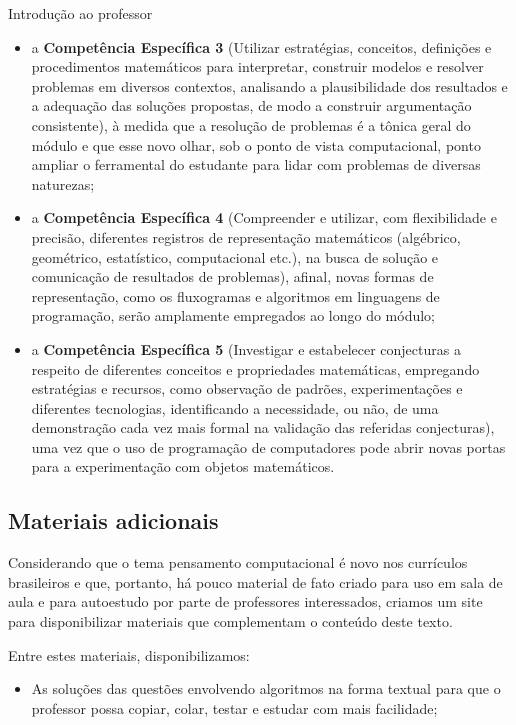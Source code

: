 \begin{apresentacao}{Introdução ao professor}
\begin{itemize}
\item a \textbf{Competência Específica 3} (Utilizar estratégias, conceitos, definições e procedimentos matemáticos para interpretar, construir modelos e resolver problemas em diversos contextos, analisando a plausibilidade dos resultados e a adequação das soluções propostas, de modo a construir argumentação consistente), à medida que a resolução de problemas é a tônica geral do módulo e que esse novo olhar, sob o ponto de vista computacional, ponto ampliar o ferramental do estudante para lidar com problemas de diversas naturezas;

\item a \textbf{Competência Específica 4} (Compreender e utilizar, com flexibilidade e precisão, diferentes registros de representação matemáticos (algébrico, geométrico, estatístico, computacional etc.), na busca de solução e comunicação de resultados de problemas), afinal, novas formas de representação, como os fluxogramas e algoritmos em linguagens de programação, serão amplamente empregados ao longo do módulo;

\item a \textbf{Competência Específica 5} (Investigar e estabelecer conjecturas a respeito de diferentes conceitos e propriedades matemáticas, empregando estratégias e recursos, como observação de padrões, experimentações e diferentes tecnologias, identificando a necessidade, ou não, de uma demonstração cada vez mais formal na validação das referidas conjecturas), uma vez que o uso de programação de computadores pode abrir novas portas para a experimentação com objetos matemáticos.

\end{itemize}

\subsection{Materiais adicionais}

Considerando que o tema pensamento computacional é novo nos currículos brasileiros e que, portanto, há pouco material de fato criado para uso em sala de aula e para autoestudo por parte de professores interessados, criamos um site para disponibilizar materiais que complementam o conteúdo deste texto.

Entre estes materiais, disponibilizamos:

\begin{itemize}

\item As soluções das questões envolvendo algoritmos na forma textual para que o professor possa copiar, colar, testar e estudar com mais facilidade;


\end{itemize}
\end{apresentacao}
